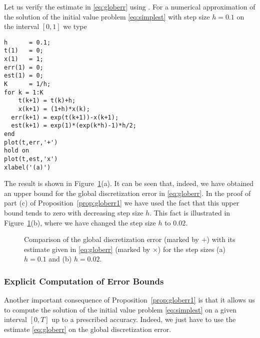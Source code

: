 \documentclass{ximera}
\begin{document}
Let us verify the estimate in \eqref{eq:globerr} using \Matlabp.  For a
numerical approximation of the solution of the initial value problem 
\eqref{eq:simplest} with step size $h=0.1$ on the interval $[0,1]$
we type
\begin{verbatim}
h      = 0.1;
t(1)   = 0;
x(1)   = 1;
err(1) = 0;
est(1) = 0;
K      = 1/h;
for k = 1:K
    t(k+1) = t(k)+h;
    x(k+1) = (1+h)*x(k);
  err(k+1) = exp(t(k+1))-x(k+1);
  est(k+1) = exp(1)*(exp(k*h)-1)*h/2;
end
plot(t,err,'+')
hold on
plot(t,est,'x')
xlabel('(a)')
\end{verbatim}
The result is shown in Figure~\ref{fig:globerr1}(a).
It can be seen that, indeed, we have
obtained an upper bound for the global discretization error in
\eqref{eq:globerr}.  In the proof of part (c) of Proposition~\ref{prop:globerr1}
we have used the fact that this upper bound tends to zero with decreasing 
step size $h$.  This fact is illustrated in Figure~\ref{fig:globerr1}(b),
where we have changed the step size $h$ to $0.02$.
\begin{figure}[htb]
   \centerline{%
   }
   \caption{Comparison of the global discretization error (marked by
   $+$) with its estimate given in \protect\eqref{eq:globerr} 
   (marked by $\times$) for the step sizes (a) $h=0.1$ and 
   (b) $h=0.02$.}
   \label{fig:globerr1}
\end{figure}

\subsubsection*{Explicit Computation of Error Bounds}

Another important consequence of Proposition~\ref{prop:globerr1} is
that it allows us to compute the solution of the initial value
problem \eqref{eq:simplest} on a given interval $[0,T]$ up to a
prescribed accuracy.  Indeed, we just have to use the estimate
\eqref{eq:globerr} on the global discretization error.  
\end{document}
